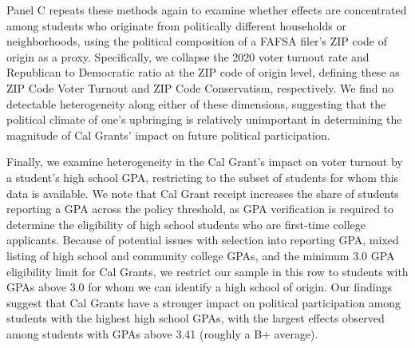 \documentclass[12pt,letterpaper,oneside]{book}
\begin{document}
Panel C repeats these methods again to examine whether effects are concentrated among students who originate from politically different households or neighborhoods, using the political composition of a FAFSA filer's ZIP code of origin as a proxy. Specifically, we collapse the 2020 voter turnout rate and Republican to Democratic ratio at the ZIP code of origin level, defining these as ZIP Code Voter Turnout and ZIP Code Conservatism, respectively. We find no detectable heterogeneity along either of these dimensions, suggesting that the political climate of one's upbringing is relatively unimportant in determining the magnitude of Cal Grants' impact on future political participation.

Finally, we examine heterogeneity in the Cal Grant's impact on voter turnout by a student's high school GPA, restricting to the subset of students for whom this data is available. We note that Cal Grant receipt increases the share of students reporting a GPA across the policy threshold, as GPA verification is required to determine the eligibility of high school students who are first-time college applicants. Because of potential issues with selection into reporting GPA, mixed listing of high school and community college GPAs, and the minimum 3.0 GPA eligibility limit for Cal Grants, we restrict our sample in this row to students with GPAs above 3.0 for whom we can identify a high school of origin. Our findings suggest that Cal Grants have a stronger impact on political participation among students with the highest high school GPAs, with the largest effects observed among students with GPAs above 3.41 (roughly a B+ average).

\clearpage
\end{document}
